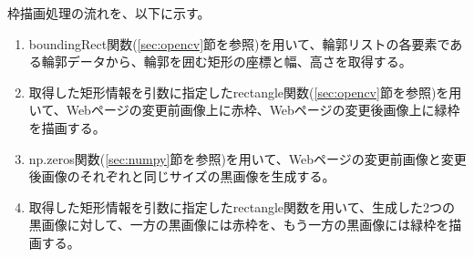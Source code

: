 \par
枠描画処理の流れを、以下に示す。
\begin{enumerate}
    \item boundingRect関数(\ref{sec:opencv}節を参照)を用いて、輪郭リストの各要素である輪郭データから、輪郭を囲む矩形の座標と幅、高さを取得する。
    \item 取得した矩形情報を引数に指定したrectangle関数(\ref{sec:opencv}節を参照)を用いて、Webページの変更前画像上に赤枠、Webページの変更後画像上に緑枠を描画する。
    \item np.zeros関数(\ref{sec:numpy}節を参照)を用いて、Webページの変更前画像と変更後画像のそれぞれと同じサイズの黒画像を生成する。
    \item 取得した矩形情報を引数に指定したrectangle関数を用いて、生成した2つの黒画像に対して、一方の黒画像には赤枠を、もう一方の黒画像には緑枠を描画する。
\end{enumerate}


